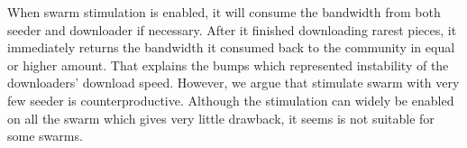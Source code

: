 When swarm stimulation is enabled, it will consume the bandwidth from both seeder and downloader if necessary. After it finished downloading rarest pieces, it immediately returns the bandwidth it consumed back to the community in equal or higher amount. That explains the bumps which represented instability of the downloaders' download speed. However, we argue that stimulate swarm with very few seeder is counterproductive. Although the stimulation can widely be enabled on all the swarm which gives very little drawback, it seems is not suitable for some swarms. 

